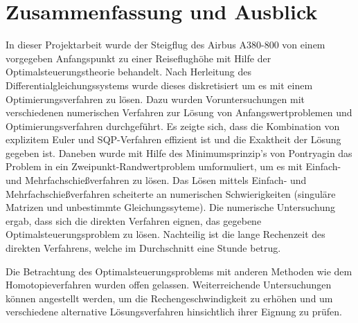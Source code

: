 \chapter{Zusammenfassung und Ausblick}

In dieser Projektarbeit wurde der Steigflug des Airbus A380-800 von einem vorgegeben Anfangspunkt zu einer Reiseflughöhe mit Hilfe der Optimalsteuerungstheorie behandelt.  Nach Herleitung des Differentialgleichungssystems wurde dieses diskretisiert um es mit einem Optimierungsverfahren zu lösen. Dazu wurden Voruntersuchungen mit verschiedenen numerischen Verfahren zur Lösung von Anfangswertproblemen und Optimierungsverfahren durchgeführt. Es zeigte sich, dass die Kombination von explizitem Euler und SQP-Verfahren effizient ist und die Exaktheit der Lösung gegeben ist. Daneben wurde mit Hilfe des Minimumsprinzip's von Pontryagin das Problem in ein Zweipunkt-Randwertproblem umformuliert, um es mit Einfach- und Mehrfachschießverfahren zu lösen. Das Lösen mittels Einfach- und Mehrfachschießverfahren scheiterte an numerischen Schwierigkeiten (singuläre Matrizen und unbestimmte Gleichungssyteme). Die numerische Untersuchung ergab, dass sich die direkten Verfahren eignen, das gegebene Optimalsteuerungsproblem zu lösen.  Nachteilig ist die lange Rechenzeit des direkten Verfahrens, welche im Durchschnitt eine Stunde betrug. 

Die Betrachtung des Optimalsteuerungsproblems mit anderen Methoden wie dem Homotopieverfahren wurden offen gelassen. Weiterreichende Untersuchungen können angestellt werden, um die Rechengeschwindigkeit zu erhöhen und um verschiedene alternative Lösungsverfahren hinsichtlich ihrer Eignung zu prüfen.
